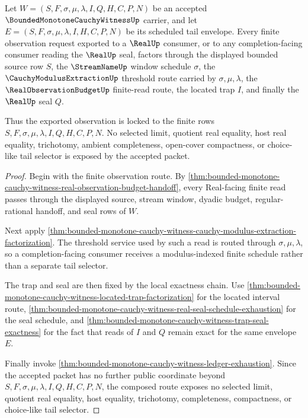 \begin{theorem}
\label{thm:bounded-monotone-cauchy-witness-finite-observation-lock}
Let $W=(S,F,\sigma,\mu,\lambda,I,Q,H,C,P,N)$ be an accepted $\BoundedMonotoneCauchyWitnessUp$ carrier, and let $E=(S,F,\sigma,\mu,\lambda,I,H,C,P,N)$ be its scheduled tail envelope. Every finite observation request exported to a $\RealUp$ consumer, or to any completion-facing consumer reading the $\RealUp$ seal, factors through the displayed bounded source row $S$, the $\StreamNameUp$ window schedule $\sigma$, the $\CauchyModulusExtractionUp$ threshold route carried by $\sigma,\mu,\lambda$, the $\RealObservationBudgetUp$ finite-read route, the located trap $I$, and finally the $\RealUp$ seal $Q$.

Thus the exported observation is locked to the finite rows $S,F,\sigma,\mu,\lambda,I,Q,H,C,P,N$. No selected limit, quotient real equality, host real equality, trichotomy, ambient completeness, open-cover compactness, or choice-like tail selector is exposed by the accepted packet.
\end{theorem}
\begin{proof}
Begin with the finite observation route. By \autoref{thm:bounded-monotone-cauchy-witness-real-observation-budget-handoff}, every Real-facing finite read passes through the displayed source, stream window, dyadic budget, regular-rational handoff, and seal rows of $W$.

Next apply \autoref{thm:bounded-monotone-cauchy-witness-cauchy-modulus-extraction-factorization}. The threshold service used by such a read is routed through $\sigma,\mu,\lambda$, so a completion-facing consumer receives a modulus-indexed finite schedule rather than a separate tail selector.

The trap and seal are then fixed by the local exactness chain. Use \autoref{thm:bounded-monotone-cauchy-witness-located-trap-factorization} for the located interval route, \autoref{thm:bounded-monotone-cauchy-witness-real-seal-schedule-exhaustion} for the seal schedule, and \autoref{thm:bounded-monotone-cauchy-witness-trap-seal-exactness} for the fact that reads of $I$ and $Q$ remain exact for the same envelope $E$.

Finally invoke \autoref{thm:bounded-monotone-cauchy-witness-ledger-exhaustion}. Since the accepted packet has no further public coordinate beyond $S,F,\sigma,\mu,\lambda,I,Q,H,C,P,N$, the composed route exposes no selected limit, quotient real equality, host equality, trichotomy, completeness, compactness, or choice-like tail selector.
\end{proof}

